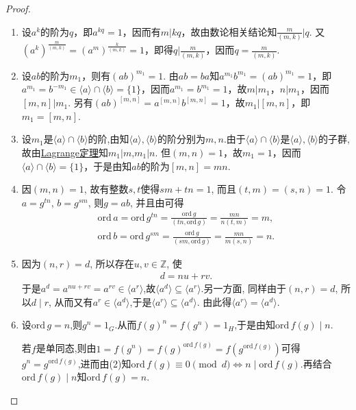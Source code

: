 \documentclass[../../main.tex]{subfiles}%
\begin{document}
\begin{proof}
\begin{enumerate}[(1)]
注意到$ba = b(ab)b^{-1}$,故只需取$g=b$,则由上述证明知$ab$与$ba$有相同的阶.

\item 设$a^k$的阶为$q$，即$a^{kq}=1$，因而有$m|kq$，故由数论相关结论知$\frac{m}{(m,k)}|q$. 又$(a^k)^{\frac{m}{(m,k)}}=(a^m)^{\frac{k}{(m,k)}}=1$，即得$q|\frac{m}{(m,k)}$，因而$q=\frac{m}{(m,k)}.$

\item 设$ab$的阶为$m_1$，则有$(ab)^{m_1}=1$. 由$ab=ba$知$a^{m_1}b^{m_1}=(ab)^{m_1}=1$，即$a^{m_1}=b^{-m_1}\in\langle a\rangle\cap\langle b\rangle=\{1\}$，因而$a^{m_1}=b^{m_1}=1$，故$m|m_1$，$n|m_1$，因而$[m,n]|m_1$. 另有$(ab)^{[m,n]}=a^{[m,n]}b^{[m,n]}=1$，故$m_1|[m,n]$，即$m_1=[m,n]$.

\item 设$m_1$是$\langle a\rangle\cap\langle b\rangle$的阶,由知$\langle a\rangle,\langle b\rangle$的阶分别为$m,n$.由于$\langle a\rangle\cap\langle b\rangle$是$\langle a\rangle,\langle b\rangle$的子群,故由\hyperref[theorem:抽象代数--Lagrange定理]{Lagrange定理}知$m_1|m$,$m_1|n$. 但$(m,n)=1$，故$m_1=1$，因而$\langle a\rangle\cap\langle b\rangle=\{1\}$，于是由知$ab$的阶为$[m,n]=mn$.

\item 因$(m,n)=1$, 故有整数$s,t$使得$sm+tn=1$, 而且$(t,m)=(s,n)=1$.
令$a=g^{tn}$, $b=g^{sm}$, 则$g=ab$, 并且由可得
\begin{align*}
\text{ord}\,a=\text{ord}\,g^{tn}=\frac{\text{ord}\,g}{(tn,\text{ord}\,g)}=\frac{mn}{n(t,m)}=m,
\\
\text{ord}\,b=\text{ord}\,g^{sm}=\frac{\text{ord}\,g}{(sm,\text{ord}\,g)}=\frac{mn}{m(s,n)}=n.
\end{align*}

\item 因为$(n,r)=d$, 所以存在$u,v\in\mathbb{Z}$, 使
\begin{align*}
d=nu+rv.
\end{align*}
于是$a^d=a^{nu+rv}=a^{rv}\in\langle a^r\rangle$,故$\langle a^d \rangle\subseteq \langle a^r \rangle$.另一方面, 同样由于$(n,r)=d$, 所以$d\mid r$, 从而又有$a^r\in\langle a^d\rangle$,于是$\langle a^r\rangle\subseteq \langle a^d\rangle$. 由此得$\langle a^r\rangle=\langle a^d\rangle$.

\item 设$\text{ord}\,g=n$,则$g^n=1_G$.从而$f\left( g \right) ^n=f\left( g^n \right) =1_H$,于是由知$\text{ord}\,f\left( g \right) \mid n$.

若$f$是单同态,则由$1=f(g^n)=f(g)^{\text{ord}\,f(g)}=f(g^{\text{ord}\,f(g)})$可得$g^n=g^{\text{ord}\,f(g)}$,进而由(2)知$\text{ord}\,f(g)\equiv 0 \pmod d \iff n\mid \text{ord}\,f(g)$.再结合$\text{ord}\,f\left( g \right) \mid n$知$\text{ord}\,f\left( g \right) =n$.
\end{enumerate}

\end{proof}
\end{document}
